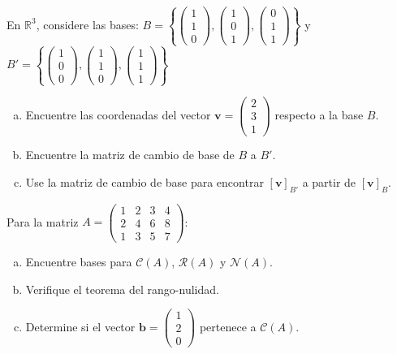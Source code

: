 \begin{prob} En $\mathbb{R}^3$, considere las bases: $B = \left\{\begin{pmatrix} 1 \\ 1 \\ 0 \end{pmatrix}, \begin{pmatrix} 1 \\ 0 \\ 1 \end{pmatrix}, \begin{pmatrix} 0 \\ 1 \\ 1 \end{pmatrix}\right\}$ y $B' = \left\{\begin{pmatrix} 1 \\ 0 \\ 0 \end{pmatrix}, \begin{pmatrix} 1 \\ 1 \\ 0 \end{pmatrix}, \begin{pmatrix} 1 \\ 1 \\ 1 \end{pmatrix}\right\}$

\begin{enumerate}[(a)]
\item Encuentre las coordenadas del vector $\mathbf{v} = \begin{pmatrix} 2 \\ 3 \\ 1 \end{pmatrix}$ respecto a la base $B$.
\item Encuentre la matriz de cambio de base de $B$ a $B'$.
\item Use la matriz de cambio de base para encontrar $[\mathbf{v}]_{B'}$ a partir de $[\mathbf{v}]_B$.
\end{enumerate}
\end{prob}

\begin{prob} Para la matriz $A = \begin{pmatrix} 1 & 2 & 3 & 4 \\ 2 & 4 & 6 & 8 \\ 1 & 3 & 5 & 7 \end{pmatrix}$:
\begin{enumerate}[(a)]
\item Encuentre bases para $\mathcal{C}(A)$, $\mathcal{R}(A)$ y $\mathcal{N}(A)$.
\item Verifique el teorema del rango-nulidad.
\item Determine si el vector $\mathbf{b} = \begin{pmatrix} 1 \\ 2 \\ 0 \end{pmatrix}$ pertenece a $\mathcal{C}(A)$.
\end{enumerate}
\end{prob}


